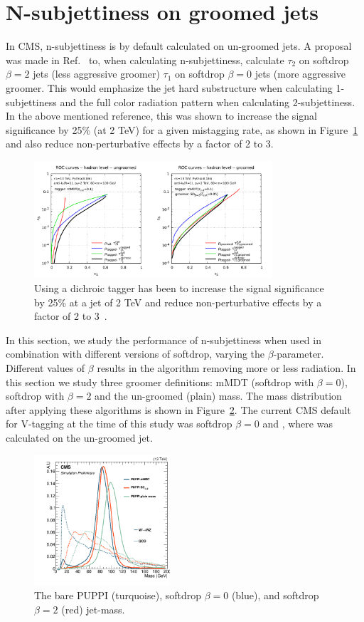 \section{N-subjettiness on groomed jets}
\label{app:vtag:dichroic}
In CMS, n-subjettiness is by default calculated on un-groomed jets. A proposal was made in Ref.~\cite{Salam:2016yht} to, when calculating n-subjettiness, calculate $\tau_2$ on softdrop $\beta=2$ jets (less aggressive groomer) $\tau_1$ on softdrop $\beta=0$ jets (more aggressive groomer. This would emphasize the jet hard substructure when calculating 1-subjettiness and the full color radiation pattern when calculating 2-subjettiness. In the above mentioned reference, this was shown to increase the signal significance by 25\% (at 2 TeV) for a given mistagging rate, as shown in Figure~\ref{fig:app:dichroic} and also reduce non-perturbative effects by a factor of 2 to 3.
\begin{figure}[h!]
\centering
\includegraphics[width=0.79\textwidth]{figures/vtagging/dichroic/arXiv-161203917.pdf}
\caption{Using a dichroic tagger has been to increase the signal significance by 25\% at a jet \PT of 2 TeV and reduce non-perturbative effects by a factor of 2 to 3~\cite{Salam:2016yht}.}
\label{fig:app:dichroic}
\end{figure}
In this section, we study the performance of n-subjettiness when used in combination with different versions of softdrop, varying the $\beta$-parameter. Different values of $\beta$ results in the algorithm removing more or less radiation. In this section we study three groomer definitions: mMDT (softdrop with $\beta=0$), softdrop with $\beta=2$ and the un-groomed (plain) mass. The mass distribution after applying these algorithms is shown in Figure~\ref{fig:app:massplots}. The current CMS default for V-tagging at the time of this study was softdrop $\beta=0$ and \nsubj, where \nsubj was calculated on the un-groomed jet.
\begin{figure}[h!]
\centering
\includegraphics[width=0.45\textwidth]{figures/vtagging/dichroic/massplots.png}
\caption{The bare PUPPI (turquoise), softdrop $\beta=0$ (blue), and softdrop $\beta=2$ (red) jet-mass.}
\label{fig:app:massplots}
\end{figure}
